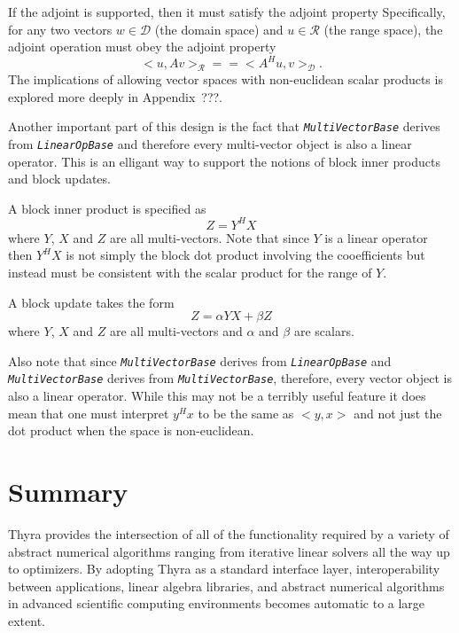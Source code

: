 \documentclass[pdf,ps2pdf,11pt]{SANDreport}
\begin{document}
If the adjoint is supported, then it must satisfy the adjoint property
Specifically, for any two vectors $w\in\mathcal{D}$ (the domain space) and
$u\in\mathcal{R}$ (the range space), the adjoint operation must obey the
adjoint property
\[
  <u,A v>_{\mathcal{R}} =\!= <A^H u, v>_{\mathcal{D}}.
\]
The implications of allowing vector spaces with non-euclidean scalar products
is explored more deeply in Appendix~???.

Another important part of this design is the fact that
{}\texttt{\textit{Multi\-Vector\-Base}} derives from
{}\texttt{\textit{Linear\-Op\-Base}} and therefore every multi-vector object
is also a linear operator.  This is an elligant way to support the notions of
block inner products and block updates.

A block inner product is specified as
\[
Z = Y^H X
\]
where $Y$, $X$ and $Z$ are all multi-vectors.  Note that since $Y$ is a linear
operator then $Y^H X$ is not simply the block dot product involving the
cooefficients but instead must be consistent with the scalar product for the
range of $Y$.

A block update takes the form
\[
Z =\alpha Y X + \beta Z
\]
where $Y$, $X$ and $Z$ are all multi-vectors and $\alpha$ and $\beta$ are
scalars.

Also note that since {}\texttt{\textit{Multi\-Vector\-Base}} derives from
{}\texttt{\textit{Linear\-Op\-Base}} and
{}\texttt{\textit{Multi\-Vector\-Base}} derives from
{}\texttt{\textit{Multi\-Vector\-Base}}, therefore, every vector object is
also a linear operator.  While this may not be a terribly useful feature it
does mean that one must interpret $y^H x$ to be the same as $<y,x>$ and not
just the dot product when the space is non-euclidean.

%
\section{Summary}
%

Thyra provides the intersection of all of the functionality required by a
variety of abstract numerical algorithms ranging from iterative linear solvers
all the way up to optimizers.  By adopting Thyra as a standard interface
layer, interoperability between applications, linear algebra libraries, and
abstract numerical algorithms in advanced scientific computing environments
becomes automatic to a large extent.

%
\clearpage



%
\appendix
%


\end{document}
